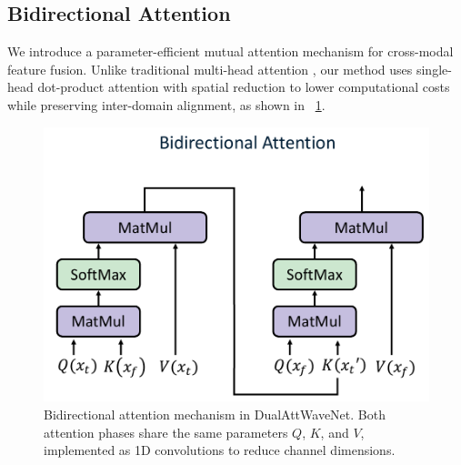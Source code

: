 \documentclass[conference]{IEEEtran}
\begin{document}




\subsection{Bidirectional Attention}
\label{subsec:bi_attn}

We introduce a parameter-efficient mutual attention mechanism for cross-modal feature fusion. Unlike traditional multi-head attention \cite{vaswaniAttentionAllYou2017}, our method uses single-head dot-product attention with spatial reduction to lower computational costs while preserving inter-domain alignment, as shown in \figurename~\ref{fig:bidirectional-attention}.

\begin{figure}[tb]
    \centering
    \includegraphics[width=0.65\linewidth]{bidirectional-attention.pdf}
    \caption{Bidirectional attention mechanism in DualAttWaveNet. Both attention phases share the same parameters $Q$, $K$, and $V$, implemented as 1D convolutions to reduce channel dimensions.}
    \label{fig:bidirectional-attention}
\end{figure}
\end{document}

